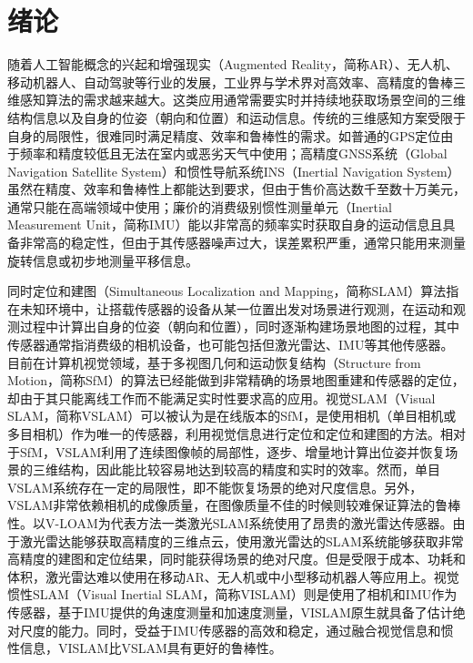 \chapter{绪论}\label{ch:intro}

随着人工智能概念的兴起和增强现实（Augmented Reality，简称AR）、无人机、移动机器人、自动驾驶等行业的发展，工业界与学术界对高效率、高精度的鲁棒三维感知算法的需求越来越大。这类应用通常需要实时并持续地获取场景空间的三维结构信息以及自身的位姿（朝向和位置）和运动信息。传统的三维感知方案受限于自身的局限性，很难同时满足精度、效率和鲁棒性的需求。如普通的GPS定位由于频率和精度较低且无法在室内或恶劣天气中使用；高精度GNSS系统（Global Navigation Satellite System）和惯性导航系统INS（Inertial Navigation System）虽然在精度、效率和鲁棒性上都能达到要求，但由于售价高达数千至数十万美元，通常只能在高端领域中使用；廉价的消费级别惯性测量单元（Inertial Measurement Unit，简称IMU）能以非常高的频率实时获取自身的运动信息且具备非常高的稳定性，但由于其传感器噪声过大，误差累积严重，通常只能用来测量旋转信息或初步地测量平移信息。

同时定位和建图（Simultaneous Localization and Mapping，简称SLAM）算法指在未知环境中，让搭载传感器的设备从某一位置出发对场景进行观测，在运动和观测过程中计算出自身的位姿（朝向和位置），同时逐渐构建场景地图的过程，其中传感器通常指消费级的相机设备，也可能包括但激光雷达、IMU等其他传感器。目前在计算机视觉领域，基于多视图几何和运动恢复结构（Structure from Motion，简称SfM）的算法\citep{hartley2003multiple,ma2012invitation}已经能做到非常精确的场景地图重建和传感器的定位，却由于其只能离线工作而不能满足实时性要求高的应用。视觉SLAM（Visual SLAM，简称VSLAM）可以被认为是在线版本的SfM，是使用相机（单目相机或多目相机）作为唯一的传感器，利用视觉信息进行定位和定位和建图的方法。相对于SfM，VSLAM利用了连续图像帧的局部性，逐步、增量地计算出位姿并恢复场景的三维结构，因此能比较容易地达到较高的精度和实时的效率。然而，单目VSLAM系统存在一定的局限性，即不能恢复场景的绝对尺度信息。另外，VSLAM非常依赖相机的成像质量，在图像质量不佳的时候则较难保证算法的鲁棒性。以V-LOAM\citep{zhang2015visual}为代表方法一类激光SLAM系统使用了昂贵的激光雷达传感器。由于激光雷达能够获取高精度的三维点云，使用激光雷达的SLAM系统能够获取非常高精度的建图和定位结果，同时能获得场景的绝对尺度。但是受限于成本、功耗和体积，激光雷达难以使用在移动AR、无人机或中小型移动机器人等应用上。视觉惯性SLAM（Visual Inertial SLAM，简称VISLAM）则是使用了相机和IMU作为传感器，基于IMU提供的角速度测量和加速度测量，VISLAM原生就具备了估计绝对尺度的能力。同时，受益于IMU传感器的高效和稳定，通过融合视觉信息和惯性信息，VISLAM比VSLAM具有更好的鲁棒性。

